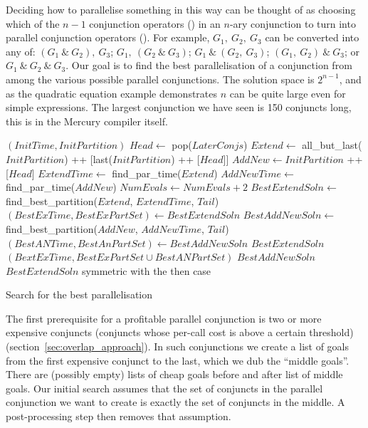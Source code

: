 Deciding how to parallelise something in this way can be thought of as
choosing which of the $n-1$ conjunction operators (\samp{,}) in an $n$-ary
conjunction to turn into parallel conjunction operators (\samp{\&}).
For example, $G_1,~G_2,~G_3$ can be converted
into any of:
$(G_1~\&~G_2),~G_3$;
$G_1,~(G_2~\&~G_3)$;
$G_1~\&~(G_2,~G_3)$;
$(G_1,~G_2)~\&~G_3$; or
$G_1~\&~G_2~\&~G_3$.
Our goal is to find the best parallelisation of a conjunction from among
the various possible parallel conjunctions.
The solution space is $2^{n-1}$, 
and as the quadratic equation example demonstrates $n$ can be quite large
even for simple expressions.
The largest conjunction we have seen is 150 conjuncts long,
this is in the Mercury compiler itself.

\begin{algorithm}[tbp]
\begin{algorithmic}[5]
    \State \Return $(InitTime, InitPartition)$
  \Else
    \State $Head \gets$ pop($LaterConjs$)
    \State $Extend \gets$ all\_but\_last($InitPartition$) ++
        [last($InitPartition$) ++ [$Head$]]
    \State $AddNew \gets InitPartition$ ++ [$Head$]
    \State $ExtendTime \gets$ find\_par\_time($Extend$)
    \State $AddNewTime \gets$ find\_par\_time($AddNew$)
    \State $NumEvals \gets NumEvals + 2$
      \State $BestExtendSoln \gets$ find\_best\_partition($Extend$,
        $ExtendTime$, $Tail$)
      \State $(BestExTime, BestExPartSet) \gets BestExtendSoln$
        \State $BestAddNewSoln \gets$ find\_best\_partition($AddNew$,
            $AddNewTime$, $Tail$)
        \State $(BestANTime, BestAnPartSet) \gets BestAddNewSoln$
          \State \Return $BestExtendSoln$
          \State \Return $(BextExTime, BestExPartSet \cup BestANPartSet)$
        \Else
          \State \Return $BestAddNewSoln$
        \EndIf
      \Else
        \State \Return $BestExtendSoln$
      \EndIf
    \Else
      \State symmetric with the then case
    \EndIf
  \EndIf
\EndProcedure
\end{algorithmic}
\caption{Search for the best parallelisation}
\label{alg:best_par_search}
\end{algorithm}

The first prerequisite for a profitable parallel conjunction is two or more
expensive conjuncts (conjuncts whose per-call cost is above a certain
threshold)
(section~\ref{sec:overlap_approach}).
In such conjunctions we create a list of goals from the first expensive
conjunct to the last,
which we dub the ``middle goals''.
There are (possibly empty) lists of cheap goals before and after list of
middle goals.
Our initial search assumes that
the set of conjuncts in the parallel conjunction we want to create
is exactly the set of conjuncts in the middle.
A post-processing step then removes that assumption.

